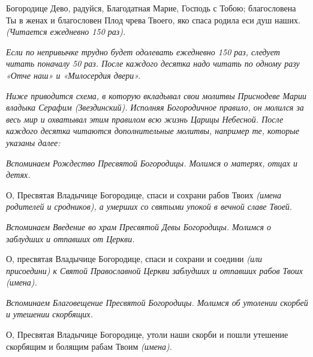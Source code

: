 

\label{_content_pered-ikonami-Presvyatoy-Bogorodici}

 

 

Богородице Дево, радуйся, Благодатная Марие, Господь с Тобою; благословена Ты в женах и благословен Плод чрева Твоего, яко спаса родила еси душ наших. \itshape (Читается ежедневно 150 раз).

\normalfont{}


\itshape Если по непривычке трудно будет одолевать ежедневно 150 раз, следует читать поначалу 50 раз. После каждого десятка надо читать по одному разу «Отче наш» и «Милосердия двери».\normalfont{}


\itshape Ниже приводится схема, в которую вкладывал свои молитвы Приснодеве Марии владыка Серафим (Звездинский). Исполняя Богородичное правило, он молился за весь мир и охватывал этим правилом всю жизнь Царицы Небесной. После каждого десятка читаются дополнительные молитвы, например те, которые указаны далее:\normalfont{}




\itshape Вспоминаем Рождество Пресвятой Богородицы. Молимся о матерях, отцах и детях.

\normalfont{}О, Пресвятая Владычице Богородице, спаси и сохрани рабов Твоих \itshape (имена родителей и сродников)\normalfont{}, а умерших со святыми упокой в вечной славе Твоей.




\itshape Вспоминаем Введение во храм Пресвятой Девы Богородицы. Молимся о заблудших и отпавших от Церкви\normalfont{}.

О, пресвятая Владычице Богородице, спаси и сохрани и соедини \itshape (или присоедини)\normalfont{} к Святой Православной Церкви заблудших и отпавших рабов Твоих \itshape (имена).\normalfont{}




\itshape Вспоминаем Благовещение Пресвятой Богородицы. Молимся об утолении скорбей и утешении скорбящих.

\normalfont{}О, Пресвятая Владычице Богородице, утоли наши скорби и пошли утешение скорбящим и болящим рабам Твоим \itshape (имена)\normalfont{}.


